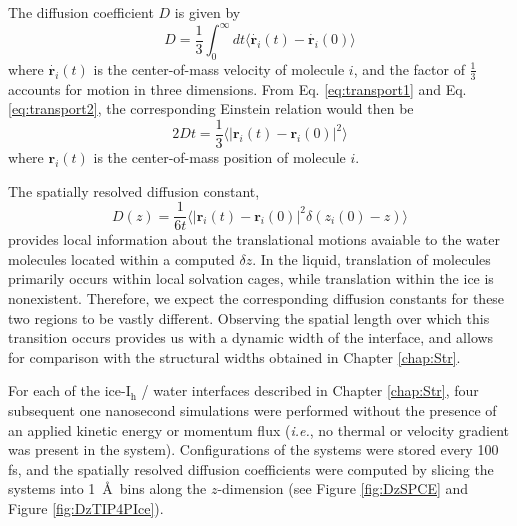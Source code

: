 The diffusion coefficient $D$ is given by
\begin{equation}\label{eq:diffusion1}
D = \frac{1}{3} \int_0^{\infty} dt \langle \dot{\bm{r}_i}(t) -
\dot{\bm{r}_i}(0) \rangle
\end{equation}
where $\dot{\bm{r}_i}(t)$ is the center-of-mass velocity of molecule
$i$, and the factor of $\frac{1}{3}$ accounts for motion in three
dimensions. From Eq. \eqref{eq:transport1} and Eq. \eqref{eq:transport2},
the corresponding Einstein relation would then be
\begin{equation}\label{eq:diffusion2}
2Dt = \frac{1}{3} \langle | \bm{r}_i(t) - \bm{r}_i(0) |^2 \rangle
\end{equation}
where $\bm{r}_i(t)$ is the center-of-mass position of molecule
$i$. 

The spatially resolved diffusion constant,
\begin{equation}\label{eq:diffusion3}
D(z) = \frac{1}{6t} \langle | \bm{r}_i(t) - \bm{r}_i(0) |^2
\delta(z_i(0) - z)  \rangle 
\end{equation}
provides local information about the translational motions avaiable to
the water molecules located within a computed $\delta z$. In the
liquid, translation of molecules primarily occurs within local
solvation cages, while translation within the ice is
nonexistent. Therefore, we expect the corresponding diffusion
constants for these two regions to be vastly different. Observing the
spatial length over which this transition occurs provides us with a
dynamic width of the interface, and allows for comparison with the
structural widths obtained in Chapter \ref{chap:Str}. 

For each of the ice-I$_\mathrm{h}$ / water interfaces described in
Chapter \ref{chap:Str}, four subsequent one nanosecond simulations
were performed without the presence of an applied kinetic energy or
momentum flux (\textit{i.e.}, no thermal or velocity gradient was
present in the system). Configurations of the systems were stored
every 100 fs, and the spatially resolved diffusion coefficients were
computed by slicing the systems into 1~\AA~bins along the
$z$-dimension (see Figure \ref{fig:DzSPCE} and Figure
\ref{fig:DzTIP4PIce}).


